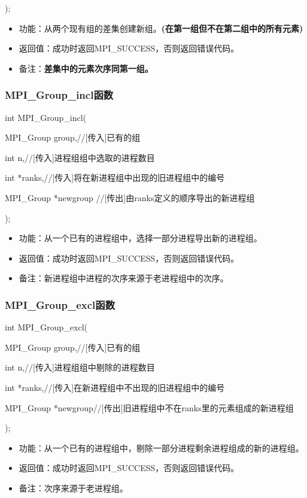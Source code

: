 \documentclass[UTF8]{article}%
\begin{document}
);

\begin{itemize}
    \item 功能：从两个现有组的差集创建新组。\textbf{(在第一组但不在第二组中的所有元素)}
    \item 返回值：成功时返回MPI\_SUCCESS，否则返回错误代码。
    \item 备注：\textbf{差集中的元素次序同第一组。}
\end{itemize}

\subsubsection{MPI\_Group\_incl函数}

int MPI\_Group\_incl(

    \qquad MPI\_Group   group,//[传入]已有的组

    \qquad int          n,//[传入]进程组组中选取的进程数目

    \qquad int          *ranks,//[传入]将在新进程组中出现的旧进程组中的编号

    \qquad MPI\_Group   *newgroup //[传出]由ranks定义的顺序导出的新进程组

);

\begin{itemize}
    \item 功能：从一个已有的进程组中，选择一部分进程导出新的进程组。
    \item 返回值：成功时返回MPI\_SUCCESS，否则返回错误代码。
    \item 备注：新进程组中进程的次序来源于老进程组中的次序。
\end{itemize}

\subsubsection{MPI\_Group\_excl函数}

int MPI\_Group\_excl(

    \qquad MPI\_Group    group,//[传入]已有的组

    \qquad int          n,//[传入]进程组组中剔除的进程数目

    \qquad int          *ranks,//[传入]在新进程组中不出现的旧进程组中的编号

    \qquad MPI\_Group   *newgroup//[传出]旧进程组中不在ranks里的元素组成的新进程组

);

\begin{itemize}
    \item 功能：从一个已有的进程组中，剔除一部分进程剩余进程组成的新的进程组。
    \item 返回值：成功时返回MPI\_SUCCESS，否则返回错误代码。
    \item 备注：次序来源于老进程组。
\end{itemize}
\end{document}
